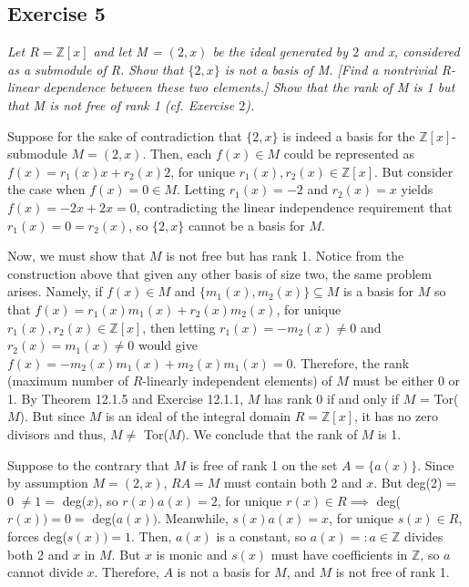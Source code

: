 \subsection*{Exercise 5}
\begin{framed}
\textit{Let $R = \mathbb{Z}[x]$ and let M = $(2,x)$ be the ideal generated by $2$ and x, considered as a submodule of R. Show that $\{2,x\}$ is not a basis of M. [Find a nontrivial R-linear dependence between these two elements.] Show that the rank of M is 1 but that M is not free of rank 1 (cf. Exercise $2$).}
\end{framed}
Suppose for the sake of contradiction that $\{2,x\}$ is indeed a basis for the $\mathbb{Z}[x]$-submodule $M = (2,x)$. Then, each $f(x) \in M$ could be represented as $f(x) = r_1(x)x + r_2(x)2$, for unique $r_1(x), r_2(x) \in \mathbb{Z}[x]$. But consider the case when $f(x) = 0 \in M$. Letting $r_1(x) = -2$ and $r_2(x) = x$ yields $f(x) = -2x + 2x = 0$, contradicting the linear independence requirement that $r_1(x) = 0 = r_2(x)$, so $\{2,x\}$ cannot be a basis for $M$.

Now, we must show that $M$ is not free but has rank 1. Notice from the construction above that given any other basis of size two, the same problem arises. Namely, if $f(x) \in M$ and $\{m_1(x), m_2(x)\} \subseteq M$ is a basis for $M$ so that $f(x) = r_1(x)m_1(x) + r_2(x)m_2(x)$, for unique $r_1(x), r_2(x) \in \mathbb{Z}[x]$, then letting $r_1(x) = -m_2(x) \not= 0$ and $r_2(x) = m_1(x) \not= 0$ would give $f(x) = -m_2(x)m_1(x) + m_2(x)m_1(x) = 0$. Therefore, the rank (maximum number of $R$-linearly independent elements) of $M$ must be either 0 or 1. By Theorem 12.1.5 and Exercise 12.1.1, $M$ has rank 0 if and only if $M$ = Tor($M$). But since $M$ is an ideal of the integral domain $R = \mathbb{Z}[x]$, it has no zero divisors and thus, $M \not=$ Tor($M)$. We conclude that the rank of $M$ is 1.

Suppose to the contrary that $M$ is free of rank 1 on the set $A = \{a(x)\}$. Since by assumption $M = (2,x)$, $RA = M$ must contain both 2 and $x$. But deg(2) = 0 $\not= 1 =$ deg($x)$, so $r(x)a(x) = 2$, for unique $r(x) \in R \implies$ deg($r(x)) = 0 =$ deg($a(x))$. Meanwhile, $s(x)a(x) = x$, for unique $s(x) \in R$, forces deg($s(x)) = 1$. Then, $a(x)$ is a constant, so $a(x) =: a \in \mathbb{Z}$ divides both 2 and $x$ in $M$. But $x$ is monic and $s(x)$ must have coefficients in $\mathbb{Z}$, so $a$ cannot divide $x$. Therefore, $A$ is not a basis for $M$, and $M$ is not free of rank 1.